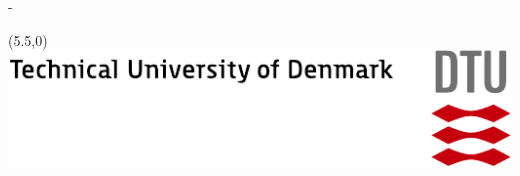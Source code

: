 \begin{titlingpage}
 \thispagestyle{empty}
 \enlargethispage{1.3cm}
 \calccentering{\unitlength}
 \begin{adjustwidth}{\unitlength}{-\unitlength}
  \vspace*{-1.9cm}
  \begin{textblock}{6.5}(5.5,0) %
   \includegraphics[width=\textwidth]{resources/tex_dtu_uk_a1_cmyk}
  \end{textblock}
  \begin{raggedright}
   {\Huge\sffamily\ThAuthors\\[2cm]}
   \begin{Spacing}{1.2}
    {\sffamily\HUGE\textbf{\ThTitleEN}\\[1.5cm]}
    {\sffamily\LARGE\textbf{{\ThSubtitleEN}}\\[1cm]}
   \end{Spacing}
 \end{raggedright}



\end{adjustwidth}
\end{titlingpage}
